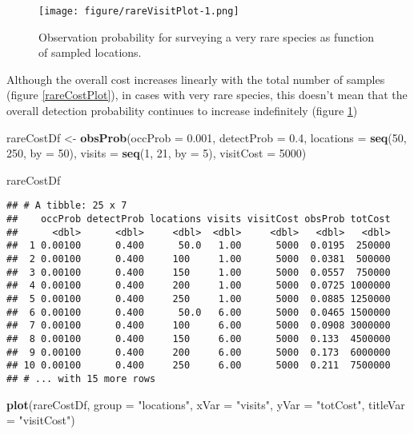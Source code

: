 \documentclass[]{article}
\newenvironment{Shaded}{\begin{snugshade}}{\end{snugshade}}
\newcommand{\KeywordTok}[1]{\textcolor[rgb]{0.13,0.29,0.53}{\textbf{#1}}}
\newcommand{\DataTypeTok}[1]{\textcolor[rgb]{0.13,0.29,0.53}{#1}}
\newcommand{\DecValTok}[1]{\textcolor[rgb]{0.00,0.00,0.81}{#1}}
\newcommand{\FloatTok}[1]{\textcolor[rgb]{0.00,0.00,0.81}{#1}}
\newcommand{\StringTok}[1]{\textcolor[rgb]{0.31,0.60,0.02}{#1}}
\newcommand{\NormalTok}[1]{#1}
\begin{document}
\begin{figure}
\centering
\texttt{[image: figure/rareVisitPlot-1.png]}
\caption{Observation probability for surveying a very rare species as
function of sampled locations. \label{rareVisitPlot}}
\end{figure}

Although the overall cost increases linearly with the total number of
samples (figure \ref{rareCostPlot}), in cases with very rare species,
this doesn't mean that the overall detection probability continues to
increase indefinitely (figure \ref{rareVisitPlot})

\begin{Shaded}
\begin{Highlighting}[]
\NormalTok{rareCostDf <-}\StringTok{ }\KeywordTok{obsProb}\NormalTok{(}\DataTypeTok{occProb =} \FloatTok{0.001}\NormalTok{, }\DataTypeTok{detectProb =} \FloatTok{0.4}\NormalTok{, }\DataTypeTok{locations =} \KeywordTok{seq}\NormalTok{(}\DecValTok{50}\NormalTok{, }
    \DecValTok{250}\NormalTok{, }\DataTypeTok{by =} \DecValTok{50}\NormalTok{), }\DataTypeTok{visits =} \KeywordTok{seq}\NormalTok{(}\DecValTok{1}\NormalTok{, }\DecValTok{21}\NormalTok{, }\DataTypeTok{by =} \DecValTok{5}\NormalTok{), }\DataTypeTok{visitCost =} \DecValTok{5000}\NormalTok{)}

\NormalTok{rareCostDf}
\end{Highlighting}
\end{Shaded}

\begin{verbatim}
## # A tibble: 25 x 7
##    occProb detectProb locations visits visitCost obsProb totCost
##      <dbl>      <dbl>     <dbl>  <dbl>     <dbl>   <dbl>   <dbl>
##  1 0.00100      0.400      50.0   1.00      5000  0.0195  250000
##  2 0.00100      0.400     100     1.00      5000  0.0381  500000
##  3 0.00100      0.400     150     1.00      5000  0.0557  750000
##  4 0.00100      0.400     200     1.00      5000  0.0725 1000000
##  5 0.00100      0.400     250     1.00      5000  0.0885 1250000
##  6 0.00100      0.400      50.0   6.00      5000  0.0465 1500000
##  7 0.00100      0.400     100     6.00      5000  0.0908 3000000
##  8 0.00100      0.400     150     6.00      5000  0.133  4500000
##  9 0.00100      0.400     200     6.00      5000  0.173  6000000
## 10 0.00100      0.400     250     6.00      5000  0.211  7500000
## # ... with 15 more rows
\end{verbatim}

\begin{Shaded}
\begin{Highlighting}[]
\KeywordTok{plot}\NormalTok{(rareCostDf, }\DataTypeTok{group =} \StringTok{"locations"}\NormalTok{, }\DataTypeTok{xVar =} \StringTok{"visits"}\NormalTok{, }\DataTypeTok{yVar =} \StringTok{"totCost"}\NormalTok{, }\DataTypeTok{titleVar =} \StringTok{"visitCost"}\NormalTok{)}
\end{Highlighting}
\end{Shaded}
\end{document}
